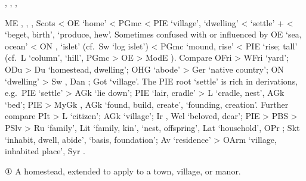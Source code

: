 \documentclass[12pt,letterpaper,oneside,article,draft]{memoir}
\begin{document}
\begin{Lemma}
\begin{Also}
	, , , 
\end{Also}
\begin{Etymology}
	ME , , , Scots  < OE  ‘home’
		< PGmc 
		< PIE  ‘village’,  ‘dwelling’
		<  ‘settle’ +   <  ‘beget, birth’,  ‘produce, hew’.
	Sometimes confused with or influenced by OE  ‘sea, ocean’
		< ON ,  ‘islet’ (cf.\ Sw  ‘log islet’)
		< PGmc  ‘mound, rise’
		< PIE  ‘rise; tall’
		(cf.\ L  ‘column’,  ‘hill’,
		PGmc  > OE  > ModE ).
	Compare
		OFri  > WFri  ‘yard’;
		ODu  > Du  ‘homestead, dwelling’;
		OHG  ‘abode’ > Ger  ‘native country’;
		ON  ‘dwelling’ > Sw , Dan ;
		Got   ‘village’.
	The PIE root  ‘settle’ is rich in derivations, e.g.\
		PIE  ‘settle’ > AGk   ‘lie down’;
		PIE \fm[*]{ḱoyno} ‘lair, cradle’ > L \fm{cunae} ‘cradle, nest’,
			AGk   ‘bed’;
		PIE  > MyGk  ,
			AGk   ‘found, build, create’,
			  ‘founding, creation’.
	Further compare
		PIt  > L  ‘citizen’;
		AGk   ‘village’;
		Ir , Wel  ‘beloved, dear’;
		PIE  > PBS  > 
			PSlv  > Ru   ‘family’,
			Lit  ‘family, kin’,  ‘nest, offspring’,
			Lat  ‘household’, OPr ;
		Skt   ‘inhabit, dwell, abide’,
			  ‘basis, foundation’;		
		Av   ‘residence’ >
			OArm   ‘village, inhabited place’,
			Syr  .
\end{Etymology}
\begin{Definitions}
		① A homestead, extended to apply to a town, village, or manor.
\end{Definitions}
\begin{Examples}

\end{Examples}
\end{Lemma}
\end{document}
